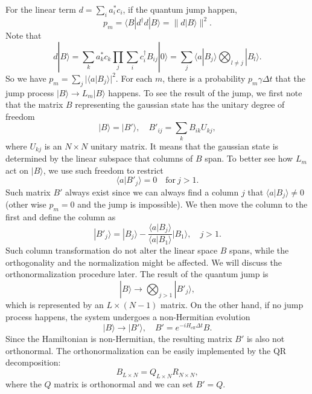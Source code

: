 \documentclass[aps,prb,superscriptaddress,nofootinbib]{revtex4}
\begin{document}
For the linear term $d = \sum_i a_i^* c_i$, if the quantum jump happen, 
\begin{equation}
	p_m = \langle B|d^\dagger d |B\rangle = \| d|B\rangle \|^2.
\end{equation}
Note that
\begin{equation}
	d|B\rangle = \sum_k a_k^* c_k \prod_{j} \sum_i c_i^\dagger B_{ij} |0\rangle
	=\sum_j \langle a|B_j\rangle \bigotimes_{l\ne j}|B_l\rangle.
\end{equation}
So we have $p_m = \sum_j |\langle a|B_j\rangle|^2$.
For each $m$, there is a probability $p_m \gamma \Delta t$ that the jump process $|B\rangle \rightarrow L_m|B\rangle$ happens.
To see the result of the jump, we first note that the matrix $B$ representing the gaussian state has the unitary degree of freedom
\begin{equation}
	|B\rangle = |B'\rangle, \quad B'_{ij} = \sum_k B_{ik}U_{kj},
\end{equation}
where $U_{kj}$ is an $N\times N$ unitary matrix.
It means that the gaussian state is determined by the linear subspace that columns of $B$ span.
To better see how $L_m$ act on $|B\rangle$, we use such freedom to restrict
\begin{equation}
	\langle a| B'_{j}\rangle = 0 \quad \text{for} \ j>1.
\end{equation}
Such matrix $B'$ always exist since we can always find a column $j$ that $\langle a| B_{j}\rangle \ne 0$ (other wise $p_m=0$ and the jump is impossible).
We then move the column to the first and define the column as
\begin{equation}
	|B'_{j}\rangle = |B_{j}\rangle - \frac{\langle a|B_{j}\rangle}{\langle a|B_{1}\rangle} |B_{1}\rangle, \quad j>1.
\end{equation}
Such column transformation do not alter the linear space $B$ spans, while the orthogonality and the normalization might be affected. 
We will discuss the orthonormalization procedure later.
The result of the quantum jump is 
\begin{equation}
	|B\rangle \rightarrow \bigotimes_{j> 1} |B'_{j}\rangle,
\end{equation}
which is represented by an $L\times (N-1)$ matrix.
On the other hand, if no jump process happens, the system undergoes a non-Hermitian evolution
\begin{equation}
	|B\rangle \rightarrow |B'\rangle, \quad B' = e^{-iH_{\mathrm{eff}}\Delta t} B.
\end{equation}
Since the Hamiltonian is non-Hermitian, the resulting matrix $B'$ is also not orthonormal.
The orthonormalization can be easily implemented by the QR decomposition:
\begin{equation}
	B_{L\times N} = Q_{L\times N} R_{N\times N}, 
\end{equation}
where the $Q$ matrix is orthonormal and we can set $B' = Q$.
\end{document}
